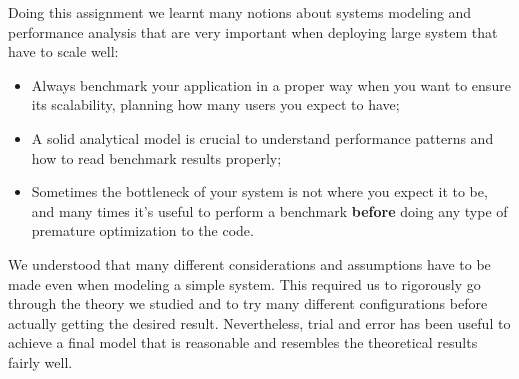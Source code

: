 \documentclass[11pt]{scrartcl} %
\begin{document}
Doing this assignment we learnt many notions about systems modeling and performance analysis that are very important when deploying large system that have to scale well:

\begin{itemize}
\item[\adforn{43}] Always benchmark your application in a proper way when you want to ensure its scalability, planning how many users you expect to have;
\item[\adforn{43}] A solid analytical model is crucial to understand performance patterns and how to read benchmark results properly;
\item[\adforn{43}] Sometimes the bottleneck of your system is not where you expect it to be, and many times it's useful to perform a benchmark \textbf{before} doing any type of premature optimization to the code.
\end{itemize}

We understood that many different considerations and assumptions have to be made even when modeling a simple system. This required us to rigorously go through the theory we studied and to try many different configurations before actually getting the desired result. Nevertheless, trial and error has been useful to achieve a final model that is reasonable and resembles the theoretical results fairly well.
\end{document}
